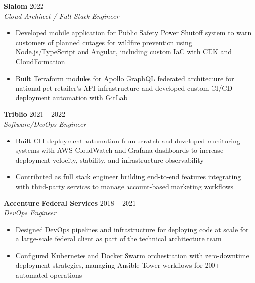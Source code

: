 \documentclass[11pt,letterpaper]{article}
\begin{document}
\noindent\textbf{\textcolor{primary}{Slalom}} \hfill \textcolor{lighttext}{2022}\\
\textit{\textcolor{accent}{Cloud Architect / Full Stack Engineer}}
\begin{itemize}
    \item\small\textcolor{darktext}{Developed mobile application for Public Safety Power Shutoff system to warn customers of planned outages for wildfire prevention using Node.js/TypeScript and Angular, including custom IaC with CDK and CloudFormation}
    \item\small\textcolor{darktext}{Built Terraform modules for Apollo GraphQL federated architecture for national pet retailer's API infrastructure and developed custom CI/CD deployment automation with GitLab}
\end{itemize}
\vspace{6pt}

\noindent\textbf{\textcolor{primary}{Triblio}} \hfill \textcolor{lighttext}{2021 – 2022}\\
\textit{\textcolor{accent}{Software/DevOps Engineer}}
\begin{itemize}
    \item\small\textcolor{darktext}{Built CLI deployment automation from scratch and developed monitoring systems with AWS CloudWatch and Grafana dashboards to increase deployment velocity, stability, and infrastructure observability}
    \item\small\textcolor{darktext}{Contributed as full stack engineer building end-to-end features integrating with third-party services to manage account-based marketing workflows}
\end{itemize}
\vspace{6pt}

\noindent\textbf{\textcolor{primary}{Accenture Federal Services}} \hfill \textcolor{lighttext}{2018 – 2021}\\
\textit{\textcolor{accent}{DevOps Engineer}}
\begin{itemize}
    \item\small\textcolor{darktext}{Designed DevOps pipelines and infrastructure for deploying code at scale for a large-scale federal client as part of the technical architecture team}
    \item\small\textcolor{darktext}{Configured Kubernetes and Docker Swarm orchestration with zero-downtime deployment strategies, managing Ansible Tower workflows for 200+ automated operations}
\end{itemize}
\vspace{6pt}
\end{document}
